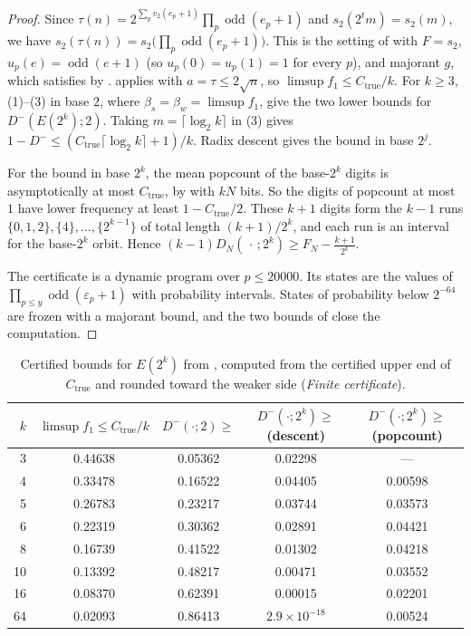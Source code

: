 \documentclass[11pt]{article}
\DeclareMathOperator{\odd}{odd}
\newcommand{\Ctrue}{C_{\mathrm{true}}}
\begin{document}
\begin{proof}
Since $\tau(n)=2^{\sum_pv_2(e_p+1)}\prod_p\odd(e_p+1)$ and $s_2(2^tm)=s_2(m)$, we have $s_2(\tau(n))=s_2\bigl(\prod_p\odd(e_p+1)\bigr)$. This is the setting of  with $F=s_2$, $u_p(e)=\odd(e+1)$ (so $u_p(0)=u_p(1)=1$ for every $p$), and majorant $g$, which satisfies  by .  applies with $a=\tau\le2\sqrt n$, so $\limsup f_1\le\Ctrue/k$. For $k\ge3$, (1)--(3) in base $2$, where $\beta_s=\beta_w=\limsup f_1$, give the two lower bounds for $D^-(E(2^k);2)$. Taking $m=\lceil\log_2k\rceil$ in (3) gives $1-D^-\le(\Ctrue\lceil\log_2k\rceil+1)/k$. Radix descent gives the bound in base $2^j$.

For the bound in base $2^k$, the mean popcount of the base-$2^k$ digits is asymptotically at most $\Ctrue$, by  with $kN$ bits. So the digits of popcount at most $1$ have lower frequency at least $1-\Ctrue/2$. These $k+1$ digits form the $k-1$ runs $\{0,1,2\},\{4\},\dots,\{2^{k-1}\}$ of total length $(k+1)/2^k$, and each run is an interval for the base-$2^k$ orbit. Hence $(k-1)D_N(\,\cdot\,;2^k)\ge F_N-\frac{k+1}{2^k}$.

The certificate is a dynamic program over $p\le20000$. Its states are the values of $\prod_{p\le y}\odd(\varepsilon_p+1)$ with probability intervals. States of probability below $2^{-64}$ are frozen with a majorant bound, and the two bounds of  close the computation.
\end{proof}

\begin{table}[ht]
\centering\small
\begin{tabular}{@{}rcccc@{}}
\toprule
$k$ & $\limsup f_1\le\Ctrue/k$ & $D^-(\cdot;2)\ge$ & $D^-(\cdot;2^k)\ge$ (descent) & $D^-(\cdot;2^k)\ge$ (popcount) \\
\midrule
3 & 0.44638 & 0.05362 & 0.02298 & --- \\
4 & 0.33478 & 0.16522 & 0.04405 & 0.00598 \\
5 & 0.26783 & 0.23217 & 0.03744 & 0.03573 \\
6 & 0.22319 & 0.30362 & 0.02891 & 0.04421 \\
8 & 0.16739 & 0.41522 & 0.01302 & 0.04218 \\
10 & 0.13392 & 0.48217 & 0.00471 & 0.03552 \\
16 & 0.08370 & 0.62391 & 0.00015 & 0.02201 \\
64 & 0.02093 & 0.86413 & $2.9\times10^{-18}$ & 0.00524 \\
\bottomrule
\end{tabular}
\caption{Certified bounds for $E(2^k)$ from , computed from the certified upper end of $\Ctrue$ and rounded toward the weaker side (\emph{Finite certificate}).}\label{tab:EB}
\end{table}
\end{document}
